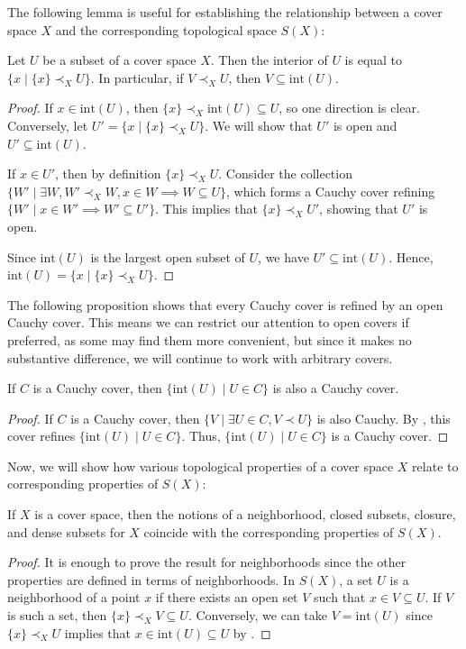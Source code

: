 \documentclass[reqno]{amsart}
\theoremstyle{definition}
\theoremstyle{remark}
\numberwithin{figure}{section}
\newcommand{\rb}{\prec}
\begin{document}
The following lemma is useful for establishing the relationship between a cover space $X$ and the corresponding topological space $S(X)$:

\begin{lem}
Let $U$ be a subset of a cover space $X$.
Then the interior of $U$ is equal to $\{ x \mid \{ x \} \rb_X U \}$.
In particular, if $V \rb_X U$, then $V \subseteq \mathrm{int}(U)$.
\end{lem}
\begin{proof}
If $x \in \mathrm{int}(U)$, then $\{ x \} \rb_X \mathrm{int}(U) \subseteq U$, so one direction is clear.
Conversely, let $U' = \{ x \mid \{ x \} \rb_X U \}$.
We will show that $U'$ is open and $U' \subseteq \mathrm{int}(U)$.

If $x \in U'$, then by definition $\{ x \} \rb_X U$.
Consider the collection $\{ W' \mid \exists W, W' \rb_X W, x \in W \implies W \subseteq U \}$, which forms a Cauchy cover refining $\{ W' \mid x \in W' \implies W' \subseteq U' \}$.
This implies that $\{ x \} \rb_X U'$, showing that $U'$ is open.

Since $\mathrm{int}(U)$ is the largest open subset of $U$, we have $U' \subseteq \mathrm{int}(U)$. Hence, $\mathrm{int}(U) = \{ x \mid \{ x \} \rb_X U \}$.
\end{proof}

The following proposition shows that every Cauchy cover is refined by an open Cauchy cover.
This means we can restrict our attention to open covers if preferred, as some may find them more convenient,
but since it makes no substantive difference, we will continue to work with arbitrary covers.

\begin{prop}
If $C$ is a Cauchy cover, then $\{ \mathrm{int}(U) \mid U \in C \}$ is also a Cauchy cover.
\end{prop}
\begin{proof}
If $C$ is a Cauchy cover, then $\{ V \mid \exists U \in C, V \rb U \}$ is also Cauchy.
By , this cover refines $\{ \mathrm{int}(U) \mid U \in C \}$.
Thus, $\{ \mathrm{int}(U) \mid U \in C \}$ is a Cauchy cover.
\end{proof}

Now, we will show how various topological properties of a cover space $X$ relate to corresponding properties of $S(X)$:

\begin{prop}
If $X$ is a cover space, then the notions of a neighborhood, closed subsets, closure, and dense subsets for $X$ coincide with the corresponding properties of $S(X)$.
\end{prop}
\begin{proof}
It is enough to prove the result for neighborhoods since the other properties are defined in terms of neighborhoods.
In $S(X)$, a set $U$ is a neighborhood of a point $x$ if there exists an open set $V$ such that $x \in V \subseteq U$.
If $V$ is such a set, then $\{ x \} \rb_X V \subseteq U$.
Conversely, we can take $V = \mathrm{int}(U)$ since $\{ x \} \rb_X U$ implies that $x \in \mathrm{int}(U) \subseteq U$ by .
\end{proof}
\end{document}
